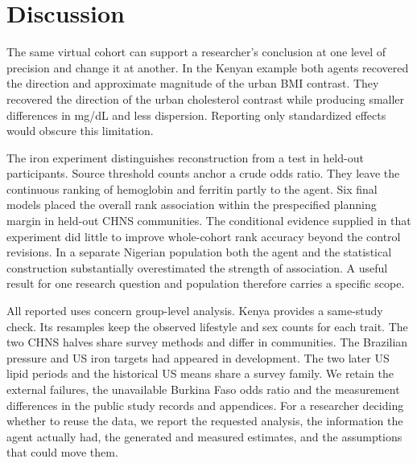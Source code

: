 \documentclass[sigconf,anonymous,review]{acmart}
\begin{document}
\section{Discussion}
The same virtual cohort can support a researcher's conclusion at one level of precision and change it at another. In the Kenyan example both agents recovered the direction and approximate magnitude of the urban BMI contrast. They recovered the direction of the urban cholesterol contrast while producing smaller differences in mg/dL and less dispersion. Reporting only standardized effects would obscure this limitation.

The iron experiment distinguishes reconstruction from a test in held-out participants. Source threshold counts anchor a crude odds ratio. They leave the continuous ranking of hemoglobin and ferritin partly to the agent. Six final models placed the overall rank association within the prespecified planning margin in held-out CHNS communities. The conditional evidence supplied in that experiment did little to improve whole-cohort rank accuracy beyond the control revisions. In a separate Nigerian population both the agent and the statistical construction substantially overestimated the strength of association. A useful result for one research question and population therefore carries a specific scope.

All reported uses concern group-level analysis. Kenya provides a same-study check. Its resamples keep the observed lifestyle and sex counts for each trait. The two CHNS halves share survey methods and differ in communities. The Brazilian pressure and US iron targets had appeared in development. The two later US lipid periods and the historical US means share a survey family. We retain the external failures, the unavailable Burkina Faso odds ratio and the measurement differences in the public study records and appendices. For a researcher deciding whether to reuse the data, we report the requested analysis, the information the agent actually had, the generated and measured estimates, and the assumptions that could move them.



\clearpage
\appendix

\end{document}
